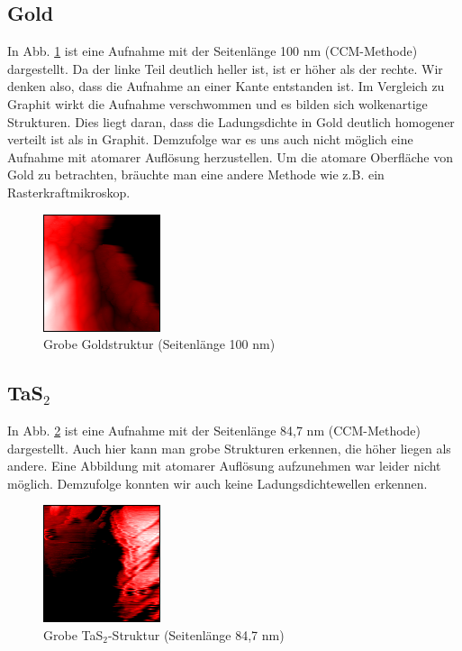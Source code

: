 \subsection{Gold}
In Abb. \ref{fig:gold} ist eine Aufnahme mit der Seitenlänge 100 nm (CCM-Methode) dargestellt.  Da der linke Teil deutlich heller ist, ist er höher als der rechte. Wir denken also, dass die Aufnahme an einer Kante entstanden ist. Im Vergleich zu Graphit wirkt die Aufnahme verschwommen und es bilden sich wolkenartige Strukturen. Dies liegt daran, dass die Ladungsdichte in Gold deutlich homogener verteilt ist als in Graphit. Demzufolge war es uns auch nicht möglich eine Aufnahme mit atomarer Auflösung herzustellen. Um die atomare Oberfläche von Gold zu betrachten, bräuchte man eine andere Methode wie z.B. ein Rasterkraftmikroskop.

\begin{figure}[h]
\centering
\includegraphics[scale=1]{data/gold/raw.png}
\caption{Grobe Goldstruktur (Seitenlänge 100 nm)}
\label{fig:gold}
\end{figure}

\subsection{TaS$_2$}
In Abb. \ref{fig:tas2} ist eine Aufnahme mit der Seitenlänge 84,7 nm (CCM-Methode) dargestellt. Auch hier kann man grobe Strukturen erkennen, die höher liegen als andere. Eine Abbildung mit atomarer Auflösung aufzunehmen war leider nicht möglich. Demzufolge konnten wir auch keine Ladungsdichtewellen erkennen. 

\begin{figure}[h]
\centering
\includegraphics[scale=1]{data/tas2.png}
\caption{Grobe TaS$_2$-Struktur (Seitenlänge 84,7 nm)}
\label{fig:tas2}
\end{figure}
